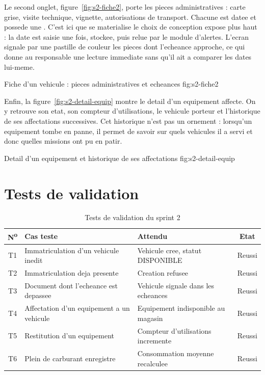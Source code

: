 Le second onglet, figure~\ref{fig:s2-fiche2}, porte les pieces
administratives : carte grise, visite technique, vignette, autorisations
de transport. Chacune est datee et possede une . C'est ici que se materialise le choix de conception expose plus
haut : la date est saisie une fois, stockee, puis relue par le module
d'alertes. L'ecran signale par une pastille de couleur les pieces dont
l'echeance approche, ce qui donne au responsable une lecture immediate
sans qu'il ait a comparer les dates lui-meme.

  {Fiche d'un vehicule : pieces administratives et echeances}
  {fig:s2-fiche2}

Enfin, la figure~\ref{fig:s2-detail-equip} montre le detail d'un
equipement affecte. On y retrouve son etat, son compteur d'utilisations,
le vehicule porteur et l'historique de ses affectations successives. Cet
historique n'est pas un ornement : lorsqu'un equipement tombe en panne, il
permet de savoir sur quels vehicules il a servi et donc quelles missions
ont pu en patir.

  {Detail d'un equipement et historique de ses affectations}
  {fig:s2-detail-equip}

\section{Tests de validation}

\begin{table}[H]
\centering
\caption{Tests de validation du sprint 2}
\label{tab:tests-s2}
\small
\begin{tabularx}{\textwidth}{@{}cXp{3.0cm}c@{}}
\toprule
\textbf{N\textsuperscript{o}} & \textbf{Cas teste} & \textbf{Attendu} &
\textbf{Etat} \\ \midrule
T1 & Immatriculation d'un vehicule inedit & Vehicule cree, statut DISPONIBLE & Reussi \\
T2 & Immatriculation deja presente & Creation refusee & Reussi \\
T3 & Document dont l'echeance est depassee & Vehicule signale dans les echeances & Reussi \\
T4 & Affectation d'un equipement a un vehicule & Equipement indisponible au magasin & Reussi \\
T5 & Restitution d'un equipement & Compteur d'utilisations incremente & Reussi \\
T6 & Plein de carburant enregistre & Consommation moyenne recalculee & Reussi \\
\bottomrule
\end{tabularx}
\end{table}

